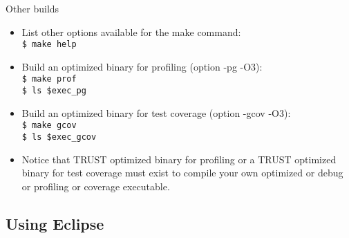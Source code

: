 \documentclass[10pt, hyperref={unicode=true,pdfusetitle, bookmarks=true,bookmarksnumbered=false,bookmarksopen=false, breaklinks=false,pdfborder={0 0 1},backref=true,colorlinks=true,linkcolor=darkblue,pageanchor, urlcolor=darkblue}]{beamer}
\begin{document}
\begin{frame}
\frametitle{}
\begin{block}{Other builds}

\begin{itemize}
\item List other options available for the make command:\\
\texttt{\$ make help}

\item Build an optimized binary for profiling (option -pg -O3):\\
\texttt{\$ make prof}\\
\texttt{\$ ls \$exec\_pg}

\item Build an optimized binary for test coverage (option -gcov -O3):\\
\texttt{\$ make gcov}\\
\texttt{\$ ls \$exec\_gcov}\\

\item Notice that TRUST optimized binary for profiling or a TRUST optimized binary for test coverage must exist 
to compile your own optimized or debug or profiling or coverage executable. \\
\end{itemize}

\end{block}
\end{frame}



\subsection{{\bf{Using Eclipse}}}
\begin{frame}
\begin{columns}[c] 
\tableofcontents[sections={1-4},currentsection, currentsubsection]
\tableofcontents[sections={5-8},currentsection, currentsubsection]
\end{columns}
\end{frame}
\end{document}
